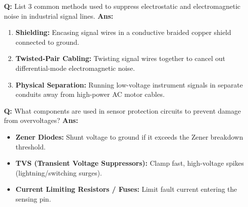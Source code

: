 \documentclass[10pt,a4paper,twocolumn]{article}
\begin{document}
\begin{tcolorbox}[
  colback=white,
  colframe=UnitColorOne,
  colbacktitle=gray!10!white,
  coltitle=black,
  fonttitle=\bfseries\sffamily\small,
  title={Unit I $\bullet$ Card 14: Noise Suppression Techniques},
  boxrule=1.2pt,
  arc=2mm,
  outer arc=2mm,
  boxsep=1.5mm,
  top=1mm,
  bottom=1mm,
  left=1.5mm,
  right=1.5mm,
  before skip=2.5mm,
  after skip=2.5mm
]
\textbf{Q:} List 3 common methods used to suppress electrostatic and electromagnetic noise in industrial signal lines.
\tcbline
\textbf{Ans:} \begin{enumerate}
  \item \textbf{Shielding:} Encasing signal wires in a conductive braided copper shield connected to ground.
  \item \textbf{Twisted-Pair Cabling:} Twisting signal wires together to cancel out differential-mode electromagnetic noise.
  \item \textbf{Physical Separation:} Running low-voltage instrument signals in separate conduits away from high-power AC motor cables.
\end{enumerate}
\end{tcolorbox}


\begin{tcolorbox}[
  colback=white,
  colframe=UnitColorOne,
  colbacktitle=gray!10!white,
  coltitle=black,
  fonttitle=\bfseries\sffamily\small,
  title={Unit I $\bullet$ Card 15: Sensor Protection Circuits},
  boxrule=1.2pt,
  arc=2mm,
  outer arc=2mm,
  boxsep=1.5mm,
  top=1mm,
  bottom=1mm,
  left=1.5mm,
  right=1.5mm,
  before skip=2.5mm,
  after skip=2.5mm
]
\textbf{Q:} What components are used in sensor protection circuits to prevent damage from overvoltages?
\tcbline
\textbf{Ans:} \begin{itemize}
  \item   \textbf{Zener Diodes:} Shunt voltage to ground if it exceeds the Zener breakdown threshold.
  \item   \textbf{TVS (Transient Voltage Suppressors):} Clamp fast, high-voltage spikes (lightning/switching surges).
  \item   \textbf{Current Limiting Resistors / Fuses:} Limit fault current entering the sensing pin.
\end{itemize}
\end{tcolorbox}
\end{document}
